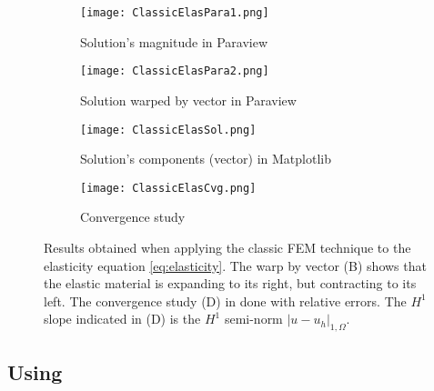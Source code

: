 \begin{figure}[H]
    \centering
    \begin{subfigure}[b]{0.40\textwidth}
        \texttt{[image: ClassicElasPara1.png]}
        \caption{Solution's magnitude in Paraview}
        \label{fig:Para1}
    \end{subfigure}
    \begin{subfigure}[b]{0.50\textwidth}
        \texttt{[image: ClassicElasPara2.png]}
        \caption{Solution warped by vector in Paraview}
        \label{fig:Para2}
    \end{subfigure}
    \begin{subfigure}[b]{0.45\textwidth}
        \texttt{[image: ClassicElasSol.png]}
        \caption{Solution's components (vector) in Matplotlib}
        \label{fig:ClassicElasSol}
    \end{subfigure}
    \begin{subfigure}[b]{0.45\textwidth}
        \texttt{[image: ClassicElasCvg.png]}
        \caption{Convergence study}
        \label{fig:ClassicElasCvg}
    \end{subfigure}
       \caption{Results obtained when applying the classic FEM technique to the elasticity equation \eqref{eq:elasticity}. The warp by vector (B) shows that the elastic material is expanding to its right, but contracting to its left. The convergence study (D) in done with relative errors. The $H^1$ slope indicated in (D) is the $H^1$ semi-norm $\vert u - u_h\vert_{1, \Omega}$.}
       \label{fig:ClassicElas}
\end{figure}


\subsection{Using \phifem}

